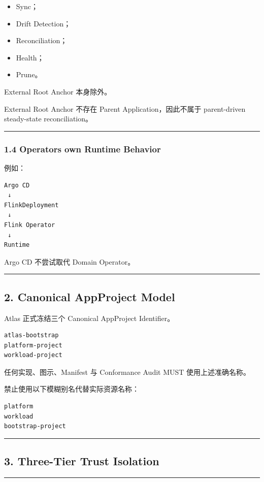 \documentclass[11pt,a4paper]{article}
\begin{document}
\begin{itemize}
  \item Sync；
  \item Drift Detection；
  \item Reconciliation；
  \item Health；
  \item Prune。
\end{itemize}
External Root Anchor 本身除外。

External Root Anchor 不存在 Parent Application，因此不属于 parent-driven steady-state reconciliation。

\vspace{0.5em}\hrule\vspace{0.5em}
\subsubsection{1.4 Operators own Runtime Behavior}
例如：

\begin{lstlisting}[language=text]
Argo CD
 ↓
FlinkDeployment
 ↓
Flink Operator
 ↓
Runtime
\end{lstlisting}
Argo CD 不尝试取代 Domain Operator。

\vspace{0.5em}\hrule\vspace{0.5em}
\subsection{2. Canonical AppProject Model}
Atlas 正式冻结三个 Canonical AppProject Identifier。

\begin{lstlisting}[language=text]
atlas-bootstrap
platform-project
workload-project
\end{lstlisting}
任何实现、图示、Manifest 与 Conformance Audit MUST 使用上述准确名称。

禁止使用以下模糊别名代替实际资源名称：

\begin{lstlisting}[language=text]
platform
workload
bootstrap-project
\end{lstlisting}
\vspace{0.5em}\hrule\vspace{0.5em}
\subsection{3. Three-Tier Trust Isolation}
\vspace{0.5em}\hrule\vspace{0.5em}
\end{document}
